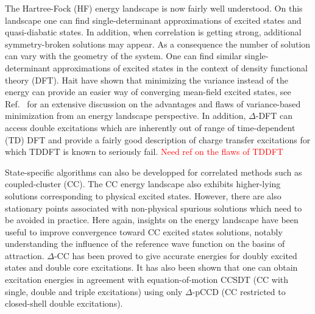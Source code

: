 \documentclass[aps,prb,reprint,showkeys,superscriptaddress]{revtex4-1}
\newcommand{\todo}[1]{\textcolor{red}{#1}}
\begin{document}
The Hartree-Fock (HF) \cite{Szabo_1996} energy landscape is now fairly well understood.\cite{Thompson_2018,Dong_2020,Burton_2021}
On this landscape one can find single-determinant approximations of excited states \cite{Gilbert_2008,Barca_2014} and quasi-diabatic states. \cite{Thom_2009}
In addition, when correlation is getting strong, additional symmetry-broken solutions may appear.\cite{Coulson_1949}
As a consequence the number of solution can vary with the geometry of the system.
One can find similar single-determinant approximations of excited states in the context of density functional theory (DFT). \cite{Hait_2020,Hait_2021}
Hait \etal have shown that minimizing the variance instead of the energy can provide an easier way of converging mean-field excited states, \cite{Hait_2020} see Ref.~ for an extensive discussion on the advantages and flaws of variance-based minimization from an energy landscape perspective.
In addition, $\Delta$-DFT can access double excitations which are inherently out of range of time-dependent (TD) DFT \cite{Hait_2021} and provide a fairly good description of charge transfer excitations for which TDDFT is known to seriously fail. \cite{Hait_2021} \todo{Need ref on the flaws of TDDFT}

State-specific algorithms can also be developped for correlated methods such as coupled-cluster (CC). \cite{Shavitt_2009}
The CC energy landscape also exhibits higher-lying solutions corresponding to physical excited states. \cite{Jankowski_1994,Jankowski_1994a,Piecuch_2000,Mayhall_2010,Lee_2019,Kossoski_2021}
However, there are also stationary points associated with non-physical spurious solutions which need to be avoided in practice. \cite{Jankowski_1994,Jankowski_1994a,Piecuch_2000,Mayhall_2010,Kossoski_2021,Marie_2021a}
Here again, insights on the energy landscape have been useful to improve convergence toward CC excited states solutions, notably understanding the influence of the reference wave function on the basins of attraction. \cite{Jankowski_1995,Lee_2019,Marie_2021a}
$\Delta$-CC has been proved to give accurate energies for doubly excited states and double core excitations. \cite{Lee_2019}
It has also been shown that one can obtain excitation energies in agreement with equation-of-motion CCSDT (CC with single, double and triple excitations) using only $\Delta$-pCCD (CC restricted to closed-shell double excitations). \cite{Kossoski_2021}
\end{document}
